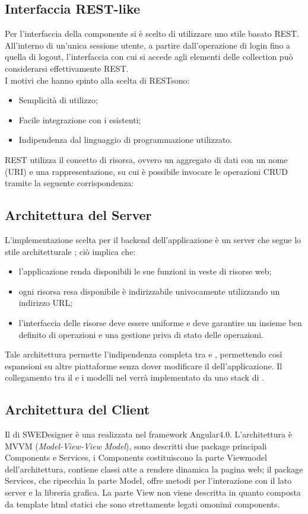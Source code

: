	\subsection{Interfaccia REST-like}
	\label{3.3}
	Per l'interfaccia della componente  si è scelto di utilizzare uno stile basato REST. All'interno di un’unica sessione utente, a partire dall’operazione di login fino a quella di logout, l'interfaccia con cui si accede agli elementi delle collection può considerarsi effettivamente REST.\\
I motivi che hanno spinto alla scelta di RESTsono:
\begin{itemize}
\item Semplicità di utilizzo;
\item Facile integrazione con i  esistenti;
\item Indipendenza dal linguaggio di programmazione utilizzato.
\end{itemize}
REST utilizza il concetto di risorsa, ovvero un aggregato di dati con un nome (URI) e una rappresentazione, su cui è possibile invocare le operazioni CRUD tramite la seguente corrispondenza:
	\subsection{Architettura del Server}
	\label{3.4}
	L'implementazione scelta per il backend dell'applicazione è un server che segue lo stile architetturale ; ciò implica che:
	\begin{itemize}
	\item l'applicazione renda disponibili le sue funzioni in veste di risorse web;
	\item ogni risorsa resa disponibile è indirizzabile univocamente utilizzando un indirizzo URL;
	\item l'interfaccia delle risorse deve essere uniforme e deve garantire un insieme ben definito di operazioni e una gestione priva di stato delle operazioni.
	\end{itemize}

Tale architettura permette l'indipendenza completa tra  e , permettendo così espansioni su altre piattaforme senza dover modificare il  dell'applicazione.
Il collegamento tra il  e i modelli nel  verrà implementato da uno stack di .
	\subsection{Architettura del Client}
	\label{3.5}
	Il  di SWEDesigner è una 
	realizzata nel framework Angular4.0. L'architettura è MVVM (\emph{Model-View-View Model}),
	sono descritti due package principali Components e Services, i Components costituiscono
	la parte Viewmodel dell'architettura, contiene classi atte a rendere dinamica la pagina web;
	il package Services, che ripecchia la parte Model, offre metodi per l'interazione con il
	lato server e la libreria grafica. La parte View non viene descritta in quanto composta da
	 template html statici che sono strettamente legati	omonimi components.
